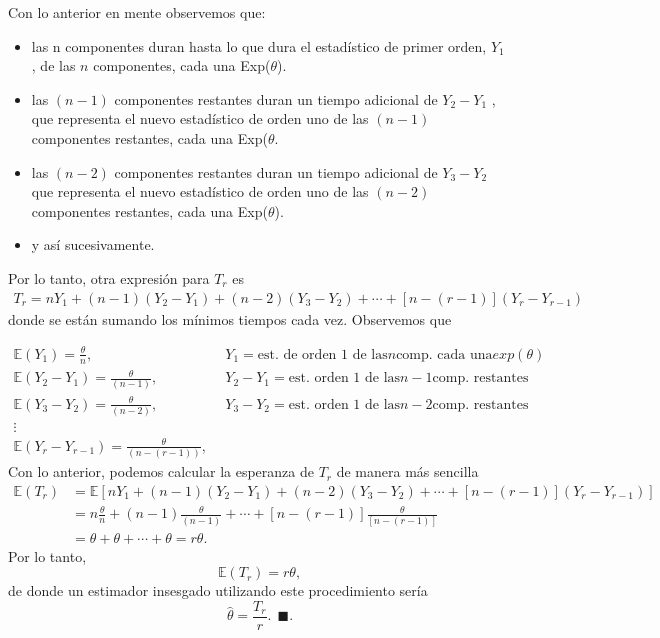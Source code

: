 \documentclass[11pt,letterpaper]{article}
\newcommand{\mE}{\mathbb{E}}
\newcommand{\finf}{\blacksquare.}
\begin{document}
Con lo anterior en mente observemos que:
\begin{itemize}
\item las n componentes duran hasta lo que dura el estadístico de primer orden, $Y_1$ , de las $n$ componentes, cada una Exp($\theta$).

\item las $(n - 1)$ componentes restantes duran un tiempo adicional de $Y_2 -Y_1$ , que representa el nuevo estadístico de orden uno de las $(n - 1)$ componentes restantes, cada una Exp($\theta$.

\item las $(n - 2)$ componentes restantes duran un tiempo adicional de $Y_3 - Y_2$ que representa el nuevo estadístico de orden uno de las $(n - 2)$ componentes restantes, cada una Exp($\theta$).

\item y así sucesivamente.
\end{itemize}
Por lo tanto, otra expresión para $T_r$ es
\begin{align*}
T_r=nY_1+(n-1)(Y_2-Y_1)+(n-2)(Y_3-Y_2)+\cdots+[n-(r-1)](Y_r-Y_{r-1})
\end{align*}
donde se están sumando los mínimos tiempos cada vez. Observemos que

\begin{align*}
\mE(Y_1)=\frac{\theta}{n},& \ \ Y_1=\text{est. de orden 1 de las} n \text{comp. cada una} exp(\theta)\\
\mE(Y_2-Y_1)=\frac{\theta}{(n-1)},& \ \ Y_2-Y_1=\text{est. orden 1 de las} n-1 \text{comp. restantes}\\
\mE(Y_3-Y_2)=\frac{\theta}{(n-2)},& \ \ Y_3-Y_2=\text{est. orden 1 de las} n-2 \text{comp. restantes}\\
\vdots& \\
\mE(Y_r-Y_{r-1})=\frac{\theta}{(n-(r-1))},&
\end{align*}
Con lo anterior, podemos calcular la esperanza de $T_r$ de manera más sencilla
\begin{align*}
\mE(T_r)&=\mE[nY_1+(n-1)(Y_2-Y_1)+(n-2)(Y_3-Y_2)+\cdots+[n-(r-1)](Y_r-Y_{r-1})]\\
&=n\frac{\theta}{n}+(n-1)\frac{\theta}{(n-1)}+\cdots+[n-(r-1)]\frac{\theta}{[n-(r-1)]}\\
&=\theta+\theta+\cdots+\theta=r\theta.
\end{align*}
Por lo tanto, 
$$\mE(T_r)=r\theta,$$
de donde un estimador insesgado utilizando este procedimiento sería $$\hat{\theta}=\frac{T_r}{r}. \ \ \finf$$
\end{document}
